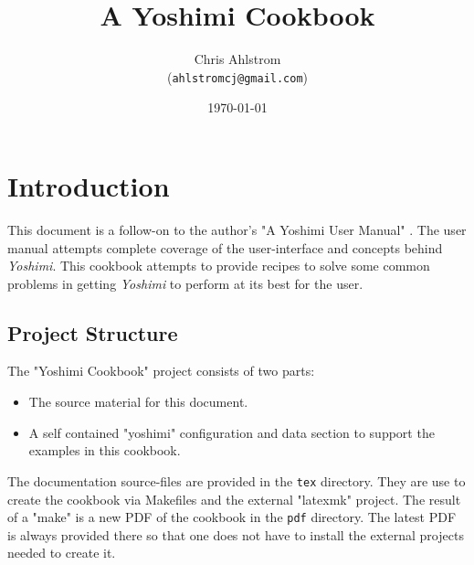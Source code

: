 \documentclass[
 11pt,
 twoside,
 a4paper,
 headinclude,
 footinclude,
 final                                 %
]{article}
\begin{document}
\title{A Yoshimi Cookbook}
\author{Chris Ahlstrom\\
   (\texttt{ahlstromcj@gmail.com})}
\date{\today}
\maketitle
\tableofcontents
\listoffigures                         %
\listoftables                          %


\setlength{\parindent}{0pt}
\setlength{\parskip}{1ex plus 0.5ex minus 0.2ex}

\section{Introduction}
\label{sec:introduction}

   This document is a follow-on to the author's
   "A Yoshimi User Manual" \cite{yoshimidoc}.
   The user manual attempts complete coverage of the user-interface and
   concepts behind \textsl{Yoshimi}.
   This cookbook attempts to provide recipes to solve some common problems
   in getting \textsl{Yoshimi} to perform at its best for the user.

\subsection{Project Structure}
\label{subsec:introduction_project_structure}

   The "Yoshimi Cookbook" project consists of two parts:

   \begin{itemize}
      \item The source material for this document.
      \item A self contained "yoshimi" configuration and data
            section to support the examples in this cookbook.
   \end{itemize}

   The documentation source-files are provided in the \texttt{tex}
   directory.  They are use to create the cookbook via Makefiles and
   the external "latexmk" project.  The result of a "make" is a new
   PDF of the cookbook in the \texttt{pdf} directory.  The latest
   PDF is always provided there so that one does not have to install the
   external projects needed to create it.
\end{document}
